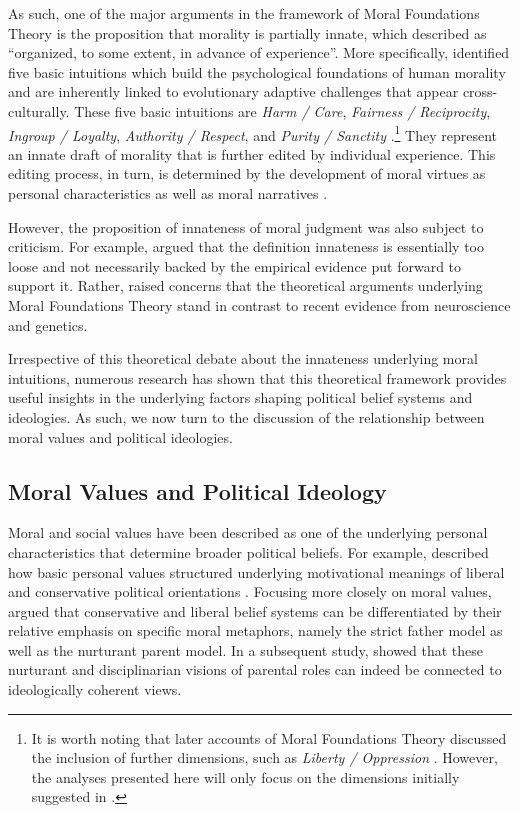 \documentclass[12pt]{paper}
\begin{document}
As such, one of the major arguments in the framework of Moral Foundations Theory is the proposition that morality is partially innate, which \citet[367]{haidt2008moral} described as ``organized, to some extent, in advance of experience''. More specifically, \citet{haidt2008moral} identified five basic intuitions which build the psychological foundations of human morality and are inherently linked to evolutionary adaptive challenges that appear cross-culturally. These five basic intuitions are \textit{Harm / Care}, \textit{Fairness / Reciprocity}, \textit{Ingroup / Loyalty}, \textit{Authority / Respect}, and \textit{Purity / Sanctity} \citep[see also][]{graham2011mapping}.\footnote{It is worth noting that later accounts of Moral Foundations Theory discussed the inclusion of further dimensions, such as \textit{Liberty / Oppression} \citep[c.f.][]{graham2013moral,haidt2012righteous}. However, the analyses presented here will only focus on the dimensions initially suggested in \citet{haidt2008moral}.} They represent an innate draft of morality that is further edited by individual experience. This editing process, in turn, is determined by the development of moral virtues as personal characteristics as well as moral narratives \citep{haidt2008moral}.

However, the proposition of innateness of moral judgment was also subject to criticism. For example, \citet{suhler2011can} argued that the definition innateness is essentially too loose and not necessarily backed by the empirical evidence put forward to support it. Rather, \citet{suhler2011can} raised concerns that the theoretical arguments underlying Moral Foundations Theory stand in contrast to recent evidence from neuroscience and genetics.

Irrespective of this theoretical debate about the innateness underlying moral intuitions, numerous research has shown that this theoretical framework provides useful insights in the underlying factors shaping political belief systems and ideologies. As such, we now turn to the discussion of the relationship between moral values and political ideologies.


\subsection{Moral Values and Political Ideology}

Moral and social values have been described as one of the underlying personal characteristics that determine broader political beliefs. For example, \citet{piurko2011basic} described how basic personal values structured underlying motivational meanings of liberal and conservative political orientations \citep[see also][]{schwartz2010basic,schwartz2011basic}. Focusing more closely on moral values, \citet{lakoff1995metaphor} argued that conservative and liberal belief systems can be differentiated by their relative emphasis on specific moral metaphors, namely the strict father model as well as the nurturant parent model. In a subsequent study, \citet{barker2006competing} showed that these nurturant and disciplinarian visions of parental roles can indeed be connected to ideologically coherent views.
\end{document}

